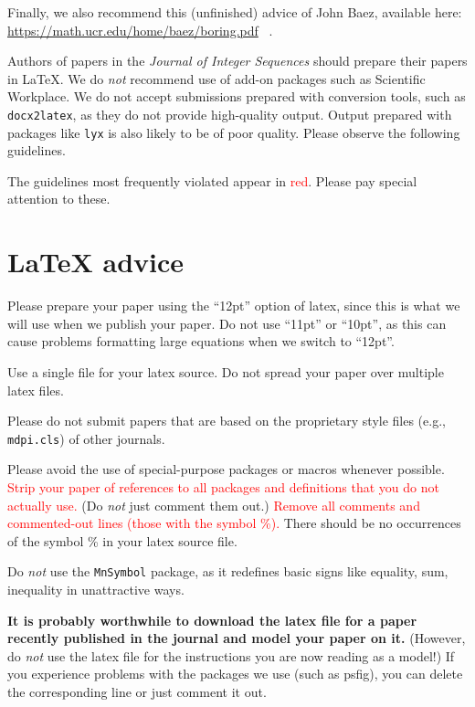 \documentclass[12pt]{article}
\begin{document}
Finally, we also recommend this (unfinished) advice of John Baez,
available here: \\  \url{https://math.ucr.edu/home/baez/boring.pdf} \, .

     Authors of papers in the {\it Journal of Integer
Sequences} should prepare their papers in LaTeX.  We do {\it not\/}
recommend use of
add-on packages such as Scientific Workplace.  We do not accept submissions
prepared with conversion tools, such as {\tt docx2latex}, as they do not
provide high-quality output.   Output prepared with packages like {\tt lyx}
is also likely to be of poor quality.
Please observe the
following guidelines.

      The guidelines most frequently violated appear in
\textcolor{red}{red}.  Please pay special attention to these.


\section{LaTeX advice}

     Please prepare your paper using the ``12pt'' option of latex, since this
is what we will use when we publish your paper.  Do not use ``11pt''
or ``10pt'', as this can cause problems formatting large equations when
we switch to ``12pt''.

     Use a single file for your latex source.  Do not spread your paper
over multiple latex files.

     Please do not submit papers that are based on the
proprietary style files
(e.g., {\tt mdpi.cls}) of other journals.  

    Please avoid the use of special-purpose packages or
macros whenever possible.
\textcolor{red}{Strip
your paper of references to all packages and definitions that you
do not actually use.}  (Do {\it not\/} just comment them out.)
\textcolor{red}{Remove all comments and commented-out lines (those with the symbol \%).}  There should be no occurrences of the symbol \% in your 
latex source file.

Do {\it not\/} use the {\tt MnSymbol} package, as it redefines basic
signs like equality, sum, inequality in unattractive ways.

{\bf It is probably worthwhile to download the latex file for a paper recently
published in the journal and model your paper on it.}  (However,
do {\it not\/} use the latex file for the instructions you are now
reading as a model!)  If you experience problems with the packages
we use (such as psfig), you can delete the corresponding line or just
comment it out.
\end{document}
